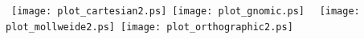 \documentclass{report}
\begin{document}
\thispagestyle{empty}
\vbox{
\vskip 12cm
\hbox{
\texttt{[image: plot\_cartesian2.ps]}
\hfill
\texttt{[image: plot\_gnomic.ps]}
}
\hbox{
\texttt{[image: plot\_mollweide2.ps]}
\hfill
\texttt{[image: plot\_orthographic2.ps]}
}
}
\end{document}
